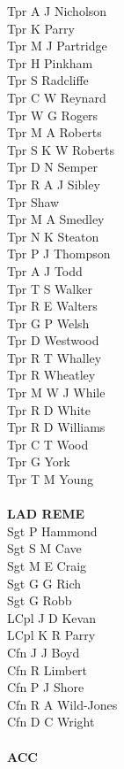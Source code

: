 \begin{multicols}{4}
  Tpr A J Nicholson \\
  Tpr K Parry \\
  Tpr M J Partridge \\
  Tpr H Pinkham \\
  Tpr S Radcliffe \\
  Tpr C W Reynard \\
  Tpr W G Rogers \\
  Tpr M A Roberts \\
  Tpr S K W Roberts \\
  Tpr D N Semper \\
  Tpr R A J Sibley \\
  Tpr Shaw \\
  Tpr M A Smedley \\
  Tpr N K Steaton \\
  Tpr P J Thompson \\
  Tpr A J Todd \\
  Tpr T S Walker \\
  Tpr R E Walters \\
  Tpr G P Welsh \\
  Tpr D Westwood \\
  Tpr R T Whalley \\
  Tpr R Wheatley \\
  Tpr M W J While \\
  Tpr R D White \\
  Tpr R D Williams \\
  Tpr C T Wood \\
  Tpr G York \\
  Tpr T M Young \\
  \\
  \textbf{LAD REME} \\
  Sgt P Hammond \\
  Sgt S M Cave \\
  Sgt M E Craig \\
  Sgt G G Rich \\
  Sgt G Robb \\
  LCpl J D Kevan \\
  LCpl K R Parry \\
  Cfn J J Boyd \\
  Cfn R Limbert \\
  Cfn P J Shore \\
  Cfn R A Wild-Jones \\
  Cfn D C Wright \\
  \\
  \textbf{ACC} \\

\end{multicols}

